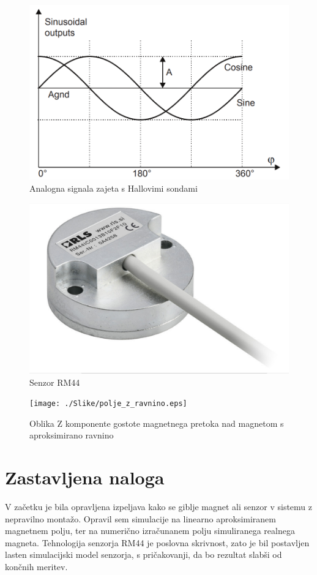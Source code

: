 \begin{figure}[h]
	\centering
	\includegraphics[width=0.8\columnwidth]{./Slike/BxBy.png}
	\caption{Analogna signala zajeta s Hallovimi sondami}
	\label{BxBy}
\end{figure}


\begin{figure}[h]
	\centering
	\includegraphics[width=0.8\columnwidth]{./Slike/senzorRM44.jpg}
	\caption{Senzor RM44}
	\label{RM44}
\end{figure}
\begin{figure}[h]
	\centering
	\texttt{[image: ./Slike/polje\_z\_ravnino.eps]}
	\caption{Oblika Z komponente gostote magnetnega pretoka nad magnetom s aproksimirano ravnino}
	\label{polje_brez_ravnine}
\end{figure}




\chapter{Zastavljena naloga}



V začetku je bila opravljena  izpeljava kako se giblje magnet ali senzor v sistemu z nepravilno montažo\cite{ursic}. Opravil sem simulacije na linearno aproksimiranem magnetnem polju, ter na numerično izračunanem polju simuliranega realnega magneta.
Tehnologija senzorja RM44 je poslovna skrivnost, zato je bil postavljen lasten simulacijski model senzorja, s pričakovanji, da bo rezultat  slabši od končnih meritev.

